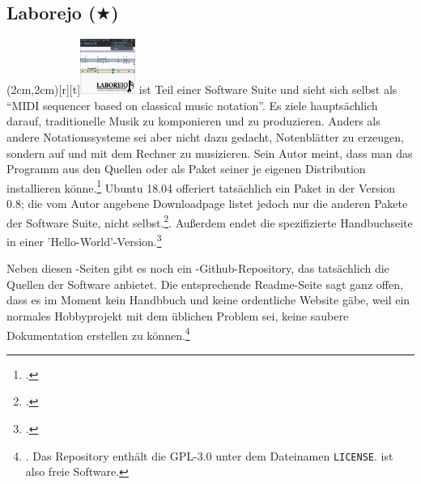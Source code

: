 %
%
%



\subsection{Laborejo ($\bigstar$)}

\parpic(2cm,2cm)[r][t]{\includegraphics[width=1.8cm]{logos/laborejo-300dpi.png}}
\label{Laborejo} ist Teil einer Software Suite und sieht sich
selbst als \enquote{MIDI sequencer based on classical music notation}. Es ziele
hauptsächlich darauf, traditionelle Musik zu komponieren und zu produzieren.
Anders als andere Notationssysteme sei  aber nicht dazu gedacht,
Notenblätter zu erzeugen, sondern auf und mit dem Rechner zu musizieren. Sein
Autor meint, dass man das Programm aus den Quellen oder als Paket seiner je
eigenen Distribution installieren könne.\footcite[vgl.][\nopage
wp.]{Hilbricht2019a} Ubuntu 18.04 offeriert tatsächlich ein Paket 
in der Version 0.8; die vom Autor angebene Downloadpage listet jedoch nur die
anderen Pakete der Software Suite, nicht 
selbst.\footcite[vgl.][\nopage wp.]{Hilbricht2019b}. Außerdem endet die
spezifizierte Handbuchseite in einer
'Hello-World'-Version.\footcite[vgl.][\nopage wp.]{Hilbricht2019c}

Neben diesen -Seiten gibt es noch ein
-Github-Repository, das tatsächlich die Quellen der Software
anbietet. Die entsprechende Readme-Seite sagt ganz offen, dass es im Moment kein
Handbbuch und keine ordentliche Website gäbe, weil  ein normales
Hobbyprojekt mit dem üblichen Problem sei, keine saubere Dokumentation erstellen
zu können.\footnote{\cite[vgl.][\nopage wp.]{Laborejo2018a}. Das Repository
enthält die GPL-3.0 unter dem Dateinamen \texttt{LICENSE}.  ist
also freie Software.}

